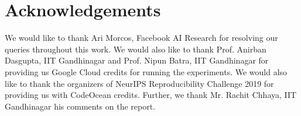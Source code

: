     
    \section{Acknowledgements}
    We would like to thank Ari Morcos, Facebook AI Research for resolving our queries throughout this work. We would also like to thank Prof. Anirban Dasgupta, IIT Gandhinagar and Prof. Nipun Batra, IIT Gandhinagar for providing us Google Cloud credits for running the experiments. We would also like to thank the organizers of NeurIPS Reproducibility Challenge 2019 for providing us with CodeOcean credits. Further, we thank Mr. Rachit Chhaya, IIT Gandhinagar his comments on the report.
    